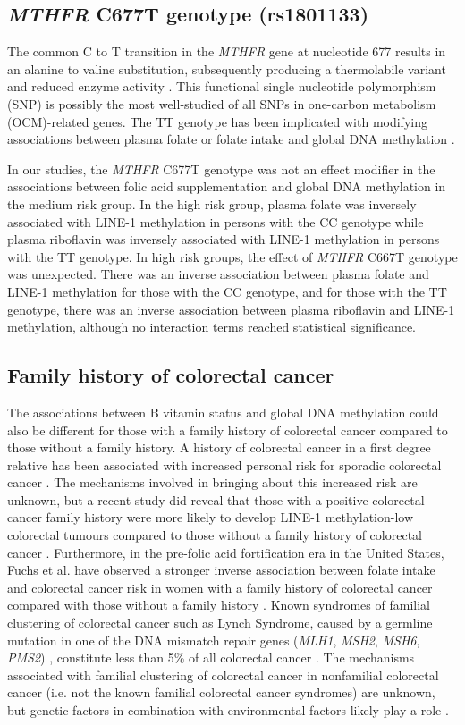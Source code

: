 \subsection{\emph{MTHFR} C677T genotype (rs1801133)} %
\noindent The common C to T transition in the \emph{MTHFR} gene at nucleotide 677 results in an alanine to valine substitution, subsequently producing a thermolabile variant and reduced enzyme activity \cite{c76}. This functional single nucleotide polymorphism (SNP) is possibly the most well-studied of all SNPs in one-carbon metabolism (OCM)-related genes. The TT genotype has been implicated with modifying associations between plasma folate or folate intake and global DNA methylation \cite{c75,c76,c712,c764,c765}. 
 
\noindent In our studies, the \emph{MTHFR} C677T genotype was not an effect modifier in the associations between folic acid supplementation and global DNA methylation in the medium risk group. In the high risk group, plasma folate was inversely associated with LINE-1 methylation in persons with the CC genotype while plasma riboflavin was inversely associated with LINE-1 methylation in persons with the TT genotype. In high risk groups, the effect of \emph{MTHFR} C667T genotype was unexpected. There was an inverse association between plasma folate and LINE-1 methylation for those with the CC genotype, and for those with the TT genotype, there was an inverse association between plasma riboflavin and LINE-1 methylation, although no interaction terms reached statistical significance. 
 
\subsection{Family history of colorectal cancer} %
\noindent The associations between B vitamin status and global DNA methylation could also be different for those with a family history of colorectal cancer compared to those without a family history. A history of colorectal cancer in a first degree relative has been associated with increased personal risk for sporadic colorectal cancer \cite{c766,c767}. The mechanisms involved in bringing about this increased risk are unknown, but a recent study did reveal that those with a positive colorectal cancer family history were more likely to develop LINE-1 methylation-low colorectal tumours compared to those without a family history of colorectal cancer \cite{c768}. Furthermore, in the pre-folic acid fortification era in the United States, Fuchs et al. have observed a stronger inverse association between folate intake and colorectal cancer risk in women with a family history of colorectal cancer compared with those without a family history \cite{c769}. Known syndromes of familial clustering of colorectal cancer such as Lynch Syndrome, caused by a germline mutation in one of the DNA mismatch repair genes (\emph{MLH1}, \emph{MSH2}, \emph{MSH6}, \emph{PMS2}) \cite{c770}, constitute less than 5\% of all colorectal cancer \cite{c771}. The mechanisms associated with familial clustering of colorectal cancer in nonfamilial colorectal cancer (i.e. not the known familial colorectal cancer syndromes) are unknown, but genetic factors in combination with environmental factors likely play a role \cite{c772}. 
 
